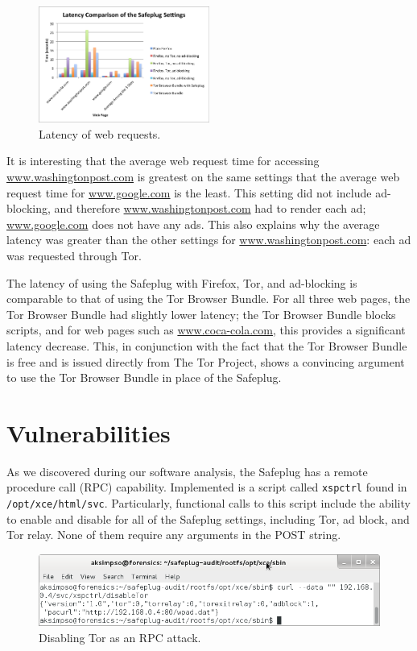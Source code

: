 \documentclass[conference]{IEEEtran}
\begin{document}
\begin{figure}
  \centering
  \includegraphics[width=0.5\textwidth]{latencygraph}
  \caption{Latency of web requests.}
  \label{fig:latency2}
\end{figure}

It is interesting that the average web request time for accessing \url{www.washingtonpost.com} is greatest on the same settings that the average web request time for \url{www.google.com} is the least. This setting did not include ad-blocking, and therefore \url{www.washingtonpost.com} had to render each ad; \url{www.google.com} does not have any ads.  This also explains why the average latency was greater than the other settings for \url{www.washingtonpost.com}: each ad was requested through Tor.   

The latency of using the Safeplug with Firefox, Tor, and ad-blocking is comparable to that of using the Tor Browser Bundle.  For all three web pages, the Tor Browser Bundle had slightly lower latency; the Tor Browser Bundle blocks scripts, and for web pages such as \url{www.coca-cola.com}, this provides a significant latency decrease.  This, in conjunction with the fact that the Tor Browser Bundle is free and is issued directly from The Tor Project, shows a convincing argument to use the Tor Browser Bundle in place of the Safeplug.  

\section{Vulnerabilities}
As we discovered during our software analysis, the Safeplug has a remote procedure call (RPC) capability.  Implemented is a script called \verb!xspctrl! found in \verb!/opt/xce/html/svc!.  Particularly, functional calls to this script include the ability to enable and disable for all of the Safeplug settings, including Tor, ad block, and Tor relay.  None of them require any arguments in the POST string.

\begin{figure}
  \centering
  \includegraphics[width=.75\textwidth]{disabletor}
  \caption{Disabling Tor as an RPC attack.}
  \label{disable}
\end{figure}
\end{document}
